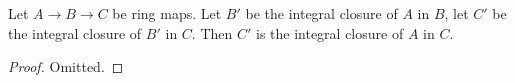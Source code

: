 \begin{lemma}
\label{lemma-integral-closure-transitive}
Let $A \to B \to C$ be ring maps.
Let $B'$ be the integral closure of $A$ in $B$,
let $C'$ be the integral closure of $B'$ in $C$. Then
$C'$ is the integral closure of $A$ in $C$.
\end{lemma}

\begin{proof}
Omitted.
\end{proof}